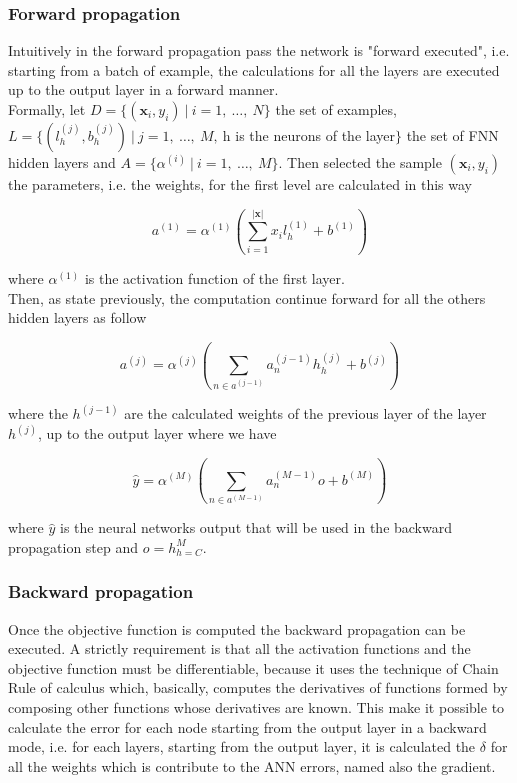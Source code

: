 \subsubsection{Forward propagation}
Intuitively in the forward propagation pass the network is "forward executed", i.e. starting from a batch of example, the calculations for all the layers are executed up to the output layer in a forward manner. \\
Formally, let $D = \{(\textbf{x}_{i}, y_{i})\ |\ i=1,\ \dots ,\ N \}$ the set of examples, $L = \{(l^{(j)}_{h}, b^{(j)}_{h})\ |\ j = 1,\ \dots,\ M,\ $h is the neurons of the layer$\}$ the set of FNN hidden layers and $A = \{\alpha^{(i)}\ |\ i = 1,\ \dots,\ M\}$. Then selected the sample $(\textbf{x}_i, y_i)$ the parameters, i.e. the weights, for the first level are calculated in this way
\begin{center}
	\begin{equation}
	a^{(1)} = \alpha^{(1)}(\sum\limits_{i=1}^{|\textbf{x}|}x_{i}l_{h}^{(1)} + b^{(1)})
	\end{equation}
\end{center}
where $\alpha^{(1)}$ is the activation function of the first layer.\\
Then, as state previously, the computation continue forward for all the others hidden layers as follow
\begin{center}
	\begin{equation}
	a^{(j)} = \alpha^{(j)}(\sum\limits_{n \in a^{(j - 1)}}a^{(j - 1)}_{n}h^{(j)}_{h} + b^{(j)})
	\end{equation}
\end{center}
where the $h^{(j - 1)}$ are the calculated weights of the previous layer of the layer $h^{(j)}$, up to the output layer where we have
\begin{center}
	\begin{equation}
	\hat{y} = \alpha^{(M)}(\sum\limits_{n \in a^{(M - 1)}}a^{(M - 1)}_{n}o + b^{(M)})	
	\end{equation}
\end{center}
where $\hat{y}$ is the neural networks output that will be used in the backward propagation step and $o = h^{M}_{h = C}$.

\subsubsection{Backward propagation}
Once the objective function is computed the backward propagation can be executed. A strictly requirement is that all the activation functions and the objective function must be differentiable, because it uses the technique of Chain Rule of calculus which, basically, computes the derivatives of functions formed by composing other functions whose derivatives are known.
This make it possible to calculate the error for each node starting from the output layer in a backward mode, i.e. for each layers, starting from the output layer, it is calculated the $\delta$ for all the weights which is contribute to the ANN errors, named also the gradient.

